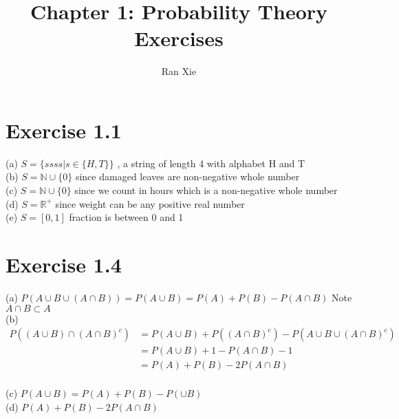 \documentclass[12pt]{article}
\title{Chapter 1: Probability Theory Exercises}
\author{Ran Xie}
\begin{document}
\maketitle

\section*{Exercise 1.1}
(a) $S=\{ ssss | s \in \{H, T\} \}$ , a string of length 4 with alphabet H and T \\

(b) $S=\mathbb{N}\cup\{0\}$ since damaged leaves are non-negative whole number\\

(c) $S=\mathbb{N}\cup\{0\}$ since we count in hours which is a non-negative whole number \\

(d) $S=\mathbb{R}^+$ since weight can be any positive real number \\

(e) $S= [0,1]$ fraction is between 0 and 1 \\

\section*{Exercise 1.4}
(a) $P(A\cup B \cup(A \cap B)) = P(A \cup B) = P(A) + P(B) - P(A \cap B)$  Note $A\cap B \subset A$ \\

(b) $$\begin{aligned}
P((A \cup B)\cap (A \cap B)^c) &= P(A\cup B) + P((A \cap B)^c) - P(A\cup B \cup (A \cap B)^c) \\
&= P(A\cup B) + 1 - P(A \cap B) - 1 \\
&= P(A) + P(B) - 2P(A\cap B) \\
\end{aligned}$$

(c) $P(A\cup B) = P(A) + P(B) - P(\cup B)$ \\

(d) $P(A) + P(B) - 2P(A\cap B)$ \\
\end{document}
